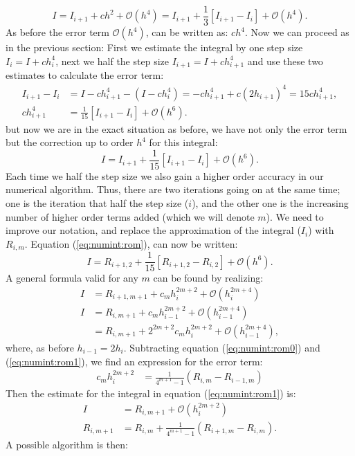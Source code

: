 \documentclass[graybox,sectrefs,envcountresetchap,open=right,final]{svmonodo}
\begin{document}
\begin{equation}
I=I_{i+1}+ch^2+\mathcal{O}(h^4)=I_{i+1}+\frac{1}{3}\left[I_{i+1}-I_{i}\right]+\mathcal{O}(h^4).
\end{equation}
As before the error term $\mathcal{O}(h^4)$, can be written as: $ch^4$. Now we can proceed as in the previous section: First we estimate the 
integral by one step size $I_i=I+ch_i^4$, next we half the step size $I_{i+1}=I+ch_{i+1}^4$ and use these two estimates to calculate the error term:
\begin{align}
I_{i+1}-I_{i}&=I-c h_{i+1}^4-(I-ch_i^4)=-c h_{i+1}^4+c(2h_{i+1})^4=15c h_{i+1}^4,\nonumber\\ 
ch_{i+1}^4&=\frac{1}{15}\left[I_{i+1}-I_{i}\right]+\mathcal{O}(h^6).
\end{align}
but now we are in the exact situation as before, we have not only the error term but the correction up to order $h^4$ for this integral:
\begin{equation}
I=I_{i+1}+\frac{1}{15}\left[I_{i+1}-I_{i}\right]+\mathcal{O}(h^6).\label{eq:numint:rom}
\end{equation}
Each time we half the step size we also gain a higher order accuracy in our numerical algorithm. Thus, there are two iterations going on at the same time; 
one is the iteration that half the step size ($i$), and the other one is the increasing number of higher order terms added (which we will denote $m$). 
We need to improve our notation, and replace the approximation of the integral ($I_i$) with $R_{i,m}$. Equation (\ref{eq:numint:rom}), can now 
be written:
\begin{equation}
I=R_{i+1,2}+\frac{1}{15}\left[R_{i+1,2}-R_{i,2}\right]+\mathcal{O}(h^6).
\end{equation}
A general formula valid for any $m$ can be found by realizing:
\begin{align}
I&=R_{i+1,m+1}+c_mh_i^{2m+2}+\mathcal{O}(h_i^{2m+4})\label{eq:numint:rom0}\\ 
I&=R_{i,m+1}+c_mh_{i-1}^{2m+2}+\mathcal{O}(h_{i-1}^{2m+4})\nonumber\\ 
&=R_{i,m+1}+2^{2m+2}c_mh_{i}^{2m+2}+\mathcal{O}(h_{i-1}^{2m+4}),\label{eq:numint:rom1}
\end{align}
where, as before $h_{i-1}=2h_i$. Subtracting equation (\ref{eq:numint:rom0}) and (\ref{eq:numint:rom1}), we find an expression for the error term:
\begin{align}
c_mh_{i}^{2m+2}&=\frac{1}{4^{m+1}-1}(R_{i,m}-R_{i-1,m})\label{eq:numint:rom2}
\end{align}
Then the estimate for the integral in equation (\ref{eq:numint:rom1}) is:
\begin{align}
I&=R_{i,m+1}+\mathcal{O}(h_i^{2m+2})\\ 
R_{i,m+1}&=R_{i,m}+\frac{1}{4^{m+1}-1}(R_{i+1,m}-R_{i,m}).
\end{align}
A possible algorithm is then:
\end{document}
